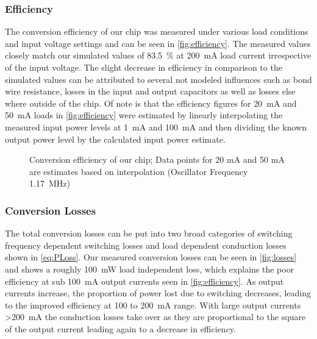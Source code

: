 \subsubsection{Efficiency}
\label{sec:efficiency}

The conversion efficiency of our chip was measured under various load conditions and input voltage settings and can be seen in \autoref{fig:efficiency}. The measured values closely match our simulated values of \qty{83.5}{\percent} at \qty{200}{\milli\ampere} load current irrespective of the input voltage. The slight decrease in efficiency in comparison to the simulated values can be attributed to several not modeled influences such as bond wire resistance, losses in the input and output capacitors as well as losses else where outside of the chip. Of note is that the efficiency figures for \qty{20}{\milli\ampere} and \qty{50}{\milli\ampere} loads in \autoref{fig:efficiency} were estimated by linearly interpolating the measured input power levels at \qty{1}{\milli\ampere} and \qty{100}{\milli\ampere} and then dividing the known output power level by the calculated input power estimate.
\begin{figure}[h]
    \centering
    
    \caption{Conversion efficiency of our chip; Data points for 20 mA and 50 mA are estimates based on interpolation (Oscillator Frequency \qty{1.17}{\mega\hertz})}
    \label{fig:efficiency}
\end{figure}
\clearpage
\subsubsection{Conversion Losses}
\label{sec:losses}
The total conversion losses can be put into two broad categories of switching frequency dependent switching losses and load dependent conduction losses shown in \autoref{eq:PLoss}. Our measured conversion losses can be seen in \autoref{fig:losses} and shows a roughly \qty{100}{\milli\watt} load independent loss, which explains the poor efficiency at sub \qty{100}{\milli\ampere} output currents seen in \autoref{fig:efficiency}. As output currents increase, the proportion of power lost due to switching decreases, leading to the improved efficiency at 100 to \qty{200}{\milli\ampere} range. With large output currents >\qty{200}{\milli\ampere} the conduction losses take over as they are proportional to the square of the output current leading again to a decrease in efficiency.

